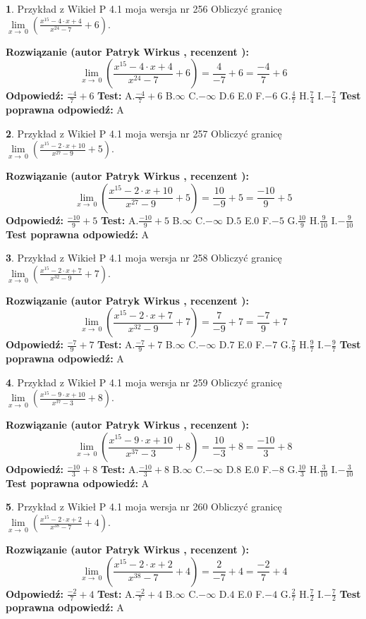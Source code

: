\documentclass[12pt, a4paper]{article}
\theoremstyle{definition} %
\newtheorem{zad}{}
\newcommand{\zadStart}[1]{\begin{zad}#1\newline}
\newcommand{\zadStop}{\end{zad}}
\newcommand{\rozwStart}[2]{\noindent \textbf{Rozwiązanie (autor #1 , recenzent #2): }\newline}
\newcommand{\rozwStop}{\newline}
\newcommand{\odpStart}{\noindent \textbf{Odpowiedź:}\newline}
\newcommand{\odpStop}{\newline}
\newcommand{\testStart}{\noindent \textbf{Test:}\newline}
\newcommand{\testStop}{\newline}
\newcommand{\kluczStart}{\noindent \textbf{Test poprawna odpowiedź:}\newline}
\newcommand{\kluczStop}{\newline}
\begin{document}
\zadStart{Przykład z Wikieł P 4.1 moja wersja nr 256}
Obliczyć granicę $\lim\limits_{x\to\ 0}(\frac{x^{15}-4 \cdot x +4}{x^{24}-7}+6)$.
\zadStop
\rozwStart{Patryk Wirkus}{}
$$\lim\limits_{x\to\ 0}(\frac{x^{15}-4 \cdot x +4}{x^{24}-7}+6)=\frac{4}{-7}+6=\frac{-4}{7}+6$$
\rozwStop
\odpStart
$\frac{-4}{7}+6$
\odpStop
\testStart
A.$\frac{-4}{7}+6$
B.$\infty$
C.$-\infty$
D.$6$
E.$0$
F.$-6$
G.$\frac{4}{7}$
H.$\frac{7}{4}$
I.$-\frac{7}{4}$
\testStop
\kluczStart
A
\kluczStop



\zadStart{Przykład z Wikieł P 4.1 moja wersja nr 257}
Obliczyć granicę $\lim\limits_{x\to\ 0}(\frac{x^{15}-2 \cdot x +10}{x^{27}-9}+5)$.
\zadStop
\rozwStart{Patryk Wirkus}{}
$$\lim\limits_{x\to\ 0}(\frac{x^{15}-2 \cdot x +10}{x^{27}-9}+5)=\frac{10}{-9}+5=\frac{-10}{9}+5$$
\rozwStop
\odpStart
$\frac{-10}{9}+5$
\odpStop
\testStart
A.$\frac{-10}{9}+5$
B.$\infty$
C.$-\infty$
D.$5$
E.$0$
F.$-5$
G.$\frac{10}{9}$
H.$\frac{9}{10}$
I.$-\frac{9}{10}$
\testStop
\kluczStart
A
\kluczStop



\zadStart{Przykład z Wikieł P 4.1 moja wersja nr 258}
Obliczyć granicę $\lim\limits_{x\to\ 0}(\frac{x^{15}-2 \cdot x +7}{x^{32}-9}+7)$.
\zadStop
\rozwStart{Patryk Wirkus}{}
$$\lim\limits_{x\to\ 0}(\frac{x^{15}-2 \cdot x +7}{x^{32}-9}+7)=\frac{7}{-9}+7=\frac{-7}{9}+7$$
\rozwStop
\odpStart
$\frac{-7}{9}+7$
\odpStop
\testStart
A.$\frac{-7}{9}+7$
B.$\infty$
C.$-\infty$
D.$7$
E.$0$
F.$-7$
G.$\frac{7}{9}$
H.$\frac{9}{7}$
I.$-\frac{9}{7}$
\testStop
\kluczStart
A
\kluczStop



\zadStart{Przykład z Wikieł P 4.1 moja wersja nr 259}
Obliczyć granicę $\lim\limits_{x\to\ 0}(\frac{x^{15}-9 \cdot x +10}{x^{37}-3}+8)$.
\zadStop
\rozwStart{Patryk Wirkus}{}
$$\lim\limits_{x\to\ 0}(\frac{x^{15}-9 \cdot x +10}{x^{37}-3}+8)=\frac{10}{-3}+8=\frac{-10}{3}+8$$
\rozwStop
\odpStart
$\frac{-10}{3}+8$
\odpStop
\testStart
A.$\frac{-10}{3}+8$
B.$\infty$
C.$-\infty$
D.$8$
E.$0$
F.$-8$
G.$\frac{10}{3}$
H.$\frac{3}{10}$
I.$-\frac{3}{10}$
\testStop
\kluczStart
A
\kluczStop



\zadStart{Przykład z Wikieł P 4.1 moja wersja nr 260}
Obliczyć granicę $\lim\limits_{x\to\ 0}(\frac{x^{15}-2 \cdot x +2}{x^{38}-7}+4)$.
\zadStop
\rozwStart{Patryk Wirkus}{}
$$\lim\limits_{x\to\ 0}(\frac{x^{15}-2 \cdot x +2}{x^{38}-7}+4)=\frac{2}{-7}+4=\frac{-2}{7}+4$$
\rozwStop
\odpStart
$\frac{-2}{7}+4$
\odpStop
\testStart
A.$\frac{-2}{7}+4$
B.$\infty$
C.$-\infty$
D.$4$
E.$0$
F.$-4$
G.$\frac{2}{7}$
H.$\frac{7}{2}$
I.$-\frac{7}{2}$
\testStop
\kluczStart
A
\kluczStop
\end{document}

